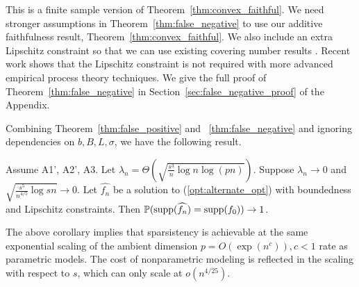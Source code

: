 This is a finite sample version of
Theorem~\ref{thm:convex_faithful}. We need stronger assumptions in
Theorem~\ref{thm:false_negative} to use our additive faithfulness
result, Theorem~\ref{thm:convex_faithful}. We also include an extra
Lipschitz constraint so that we can use existing covering number
results \cite{Bronshtein:76}. Recent work
\cite{Guntu:13} shows that the Lipschitz constraint
is not required with more advanced empirical process theory
techniques. We give the full proof of Theorem~\ref{thm:false_negative}
in Section~\ref{sec:false_negative_proof} of the Appendix.

Combining Theorem~\ref{thm:false_positive} and
~\ref{thm:false_negative} and ignoring dependencies on $b,B,L,\sigma$,
we have the following result.
\begin{corollary}
  Assume A1', A2', A3. Let $\lambda_n = \Theta\left( \sqrt{
  \frac{s^3}{n} \log n \log (pn)} \right)$. Suppose $\lambda_n
  \rightarrow 0$ and $\sqrt{\frac{s^5}{n^{4/5}} \log sn} \rightarrow
  0$. Let $\hat{f_n}$ be a solution to (\ref{opt:alternate_opt}) with
  boundedness and Lipschitz constraints. Then 
  ${\mathbb P}( \textrm{supp}(\widehat{f_n}) = \textrm{supp}(f_0) ) \rightarrow 1$.
\end{corollary}
The above corollary implies that sparsistency is achievable at the same exponential scaling of the ambient dimension $p = O(\exp(n^c)), c<1$ rate as parametric models. The cost of nonparametric modeling is reflected in the scaling with respect to $s$, which can only scale at $o(n^{4/25})$.

